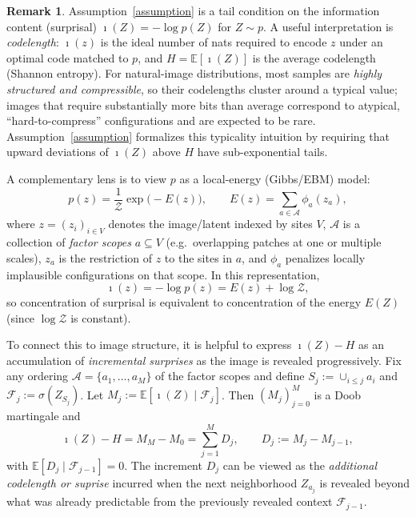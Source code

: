 \documentclass[11pt]{article}
\newcommand{\info}{\imath}         %
\theoremstyle{definition}
\newtheorem{remark}{Remark}
\newcommand{\E}{\mathbb{E}}
\numberwithin{equation}{section}
\begin{document}
\begin{remark}
Assumption~\ref{assumption} is a tail condition on the information content (surprisal)
\(
\info(Z)=-\log p(Z)
\)
for \(Z\sim p\). A useful interpretation is \emph{codelength}: \(\info(z)\) is the ideal number of nats required to encode \(z\) under an optimal code matched to \(p\), and \(H=\E[\info(Z)]\) is the average codelength (Shannon entropy). For natural-image distributions, most samples are \emph{highly structured and compressible}, so their codelengths cluster around a typical value; images that require substantially more bits than average correspond to atypical, ``hard-to-compress'' configurations and are expected to be rare. Assumption~\ref{assumption} formalizes this typicality intuition by requiring that upward deviations of \(\info(Z)\) above \(H\) have sub-exponential tails.

A complementary lens is to view \(p\) as a local-energy (Gibbs/EBM) model:
\[
p(z)=\frac{1}{\mathcal Z}\exp\!\big(-E(z)\big),
\qquad
E(z)=\sum_{a\in\mathcal A}\phi_a(z_a),
\]
where \(z=(z_i)_{i\in V}\) denotes the image/latent indexed by sites \(V\), \(\mathcal A\) is a collection of
\emph{factor scopes} \(a\subseteq V\) (e.g.\ overlapping patches at one or multiple scales), \(z_a\) is the restriction of \(z\) to the sites in \(a\), and \(\phi_a\) penalizes locally implausible configurations on that scope. In this representation,
\[
\info(z)=-\log p(z)=E(z)+\log \mathcal Z,
\]
so concentration of surprisal is equivalent to concentration of the energy \(E(Z)\) (since \(\log\mathcal Z\) is constant).

To connect this to image structure, it is helpful to express \(\info(Z)-H\) as an accumulation of
\emph{incremental surprises} as the image is revealed progressively. Fix any ordering
\(\mathcal A=\{a_1,\dots,a_M\}\) of the factor scopes and define
\(S_j:=\cup_{i\le j}a_i\) and \(\mathcal F_j:=\sigma(Z_{S_j})\).
Let \(M_j:=\E[\info(Z)\mid \mathcal F_j]\). Then \((M_j)_{j=0}^M\) is a Doob martingale and
\[
\info(Z)-H
= M_M-M_0
=\sum_{j=1}^M D_j,
\qquad D_j:=M_j-M_{j-1},
\]
with \(\E[D_j\mid \mathcal F_{j-1}]=0\). The increment \(D_j\) can be viewed as the \emph{additional codelength or suprise}
incurred when the next neighborhood \(Z_{a_j}\) is revealed beyond what was already predictable from the
previously revealed context \(\mathcal F_{j-1}\).


\end{remark}
\end{document}
